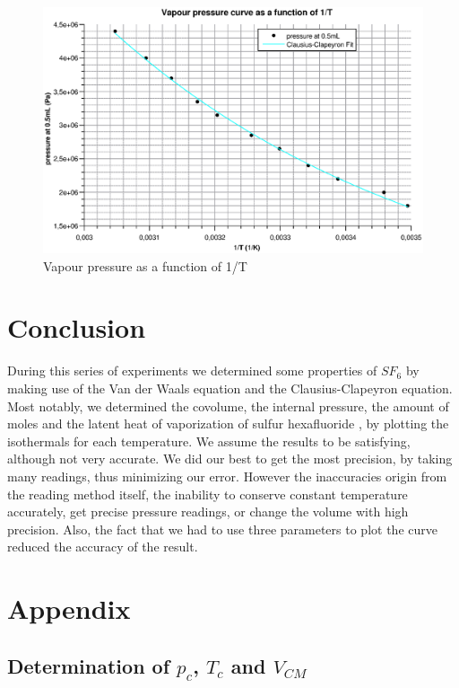 \documentclass{scrartcl}
\begin{document}
\begin{figure}[ht]
    \centering
    \includegraphics[width=12cm]{ClausiusClapeyronFit.eps}
    \caption{Vapour pressure as a function of 1/T}
    \label{fig:6}
\end{figure}

\newpage

\section{Conclusion}

During this series of experiments we determined some properties of $SF_6$ by making use of the Van der Waals equation and the Clausius-Clapeyron equation. Most notably, we determined the covolume, the internal pressure, the amount of moles and the latent heat of vaporization of sulfur hexafluoride  , by plotting the isothermals for each temperature.
We assume the results to be satisfying, although not very accurate. We did our best to get the most precision, by taking many readings, thus minimizing our error. However the inaccuracies origin from the reading method itself, the inability to conserve constant temperature accurately, get precise pressure readings, or change the volume with high precision. Also, the fact that we had to use three parameters to plot the curve reduced the accuracy of the result.%

\section{Appendix}

\subsection{Determination of $p_c$, $T_c$ and $V_{CM}$}
\end{document}
